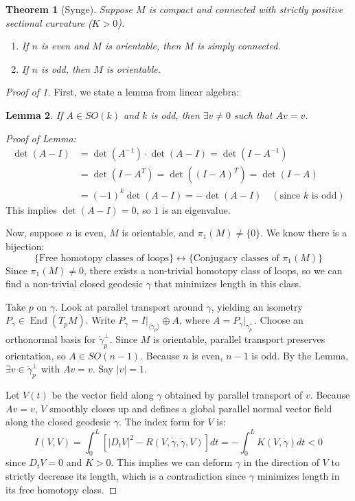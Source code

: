 \documentclass[11pt, a4paper]{article}
\theoremstyle{plain}
\newtheorem{theorem}{Theorem}[section]
\newtheorem{lemma}[theorem]{Lemma}
\theoremstyle{definition}
\theoremstyle{remark}
\DeclareMathOperator{\End}{End}
\begin{document}
{\begin{theorem}[Synge]
Suppose $M$ is compact and connected with strictly positive sectional curvature ($K > 0$).
\begin{enumerate}
    \item If $n$ is even and $M$ is orientable, then $M$ is simply connected.
    \item If $n$ is odd, then $M$ is orientable.
\end{enumerate}
\end{theorem}

\begin{proof}[Proof of 1]
First, we state a lemma from linear algebra:
\begin{lemma}
If $A \in SO(k)$ and $k$ is odd, then $\exists v \neq 0$ such that $Av = v$.
\end{lemma}
\textit{Proof of Lemma:} 
\begin{align*}
\det(A - I) &= \det(A^{-1}) \cdot \det(A - I) = \det(I - A^{-1}) \\
&= \det(I - A^T) = \det((I - A)^T) = \det(I - A) \\
&= (-1)^k \det(A - I) = -\det(A - I) \quad (\text{since } k \text{ is odd})
\end{align*}
This implies $\det(A - I) = 0$, so $1$ is an eigenvalue.

Now, suppose $n$ is even, $M$ is orientable, and $\pi_1(M) \neq \{0\}$. 
We know there is a bijection:
\[ \{\text{Free homotopy classes of loops}\} \longleftrightarrow \{\text{Conjugacy classes of } \pi_1(M)\} \]
Since $\pi_1(M) \neq 0$, there exists a non-trivial homotopy class of loops, so we can find a non-trivial closed geodesic $\gamma$ that minimizes length in this class.

Take $p$ on $\gamma$. Look at parallel transport around $\gamma$, yielding an isometry $P_\gamma \in \End(T_p M)$.
Write $P_\gamma = I|_{\langle \dot{\gamma}_p \rangle} \oplus A$, where $A = P_\gamma|_{\dot{\gamma}_p^\perp}$.
Choose an orthonormal basis for $\dot{\gamma}_p^\perp$. Since $M$ is orientable, parallel transport preserves orientation, so $A \in SO(n-1)$.
Because $n$ is even, $n-1$ is odd. By the Lemma, $\exists v \in \dot{\gamma}_p^\perp$ with $Av = v$. Say $|v| = 1$.

Let $V(t)$ be the vector field along $\gamma$ obtained by parallel transport of $v$. Because $Av = v$, $V$ smoothly closes up and defines a global parallel normal vector field along the closed geodesic $\gamma$.
The index form for $V$ is:
\[
I(V, V) = \int_0^L \left[ |D_t V|^2 - R(V, \dot{\gamma}, \dot{\gamma}, V) \right] dt = -\int_0^L K(V, \dot{\gamma}) dt < 0
\]
since $D_t V = 0$ and $K > 0$. This implies we can deform $\gamma$ in the direction of $V$ to strictly decrease its length, which is a contradiction since $\gamma$ minimizes length in its free homotopy class.
\end{proof}

}
\end{document}
